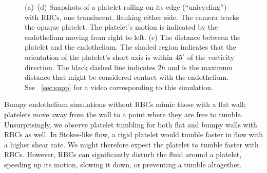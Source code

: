 \begin{figure}[tbp]
    \vspace{11pt}

    \begin{subfigure}[t]{\textwidth}
    \end{subfigure}
    \caption[Platelet unicycling behavior]{%
(a)--(d) Snapshots of a platelet rolling on its edge (``unicycling'') with RBCs, one translucent, flanking either
side. The camera tracks the opaque platelet. The platelet's motion is indicated by the endothelium moving from
right to left. (e) The distance between the platelet and the endothelium. The shaded region indicates that the
orientation of the platelet's short axis is within $45^\circ$ of the vorticity direction. The black dashed line
indicates $2h$ and is the maximum distance that might be considered contact with the endothelium. See~%
\ref{sec:supp} for a video corresponding to this simulation.
    }\label{fig:unicycle}
\end{figure}

Bumpy endothelium simulations without RBCs mimic those with a flat wall; platelets move away from the wall to a
point where they are free to tumble. Unsurprisingly, we observe platelet tumbling for both flat and bumpy walls
with RBCs as well. In Stokes-like flow, a rigid platelet would tumble faster in flow with a higher shear rate. We
might therefore expect the platelet to tumble faster with RBCs. However, RBCs can significantly disturb the fluid
around a platelet, speeding up its motion, slowing it down, or preventing a tumble altogether.

